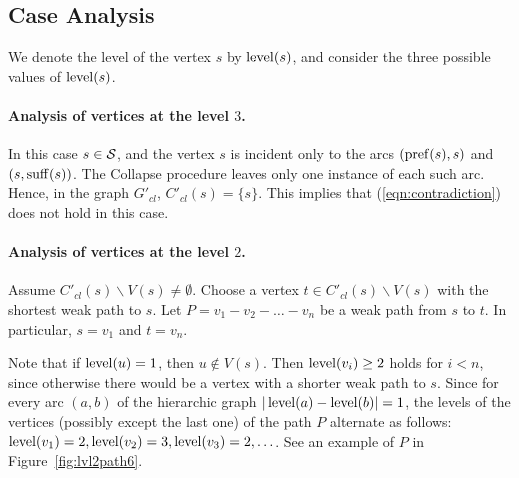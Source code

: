 \subsection{Case Analysis}
\label{sec:proof2}
We denote the level of the vertex $ s $ by $ \operatorname{level} (s) $, and consider the three possible values of $\operatorname{level}(s)$.


\paragraph{Analysis of vertices at the level \texorpdfstring{$3$}{3}.}

In this case $ s \in {\cal S} $, and the vertex $ s $ is incident only to the arcs $ (\operatorname{pref} (s), s)$ and $(s, \operatorname{suff} (s)) $. The Collapse procedure leaves only one instance of each such arc. Hence, in the graph $ G'_{cl} $, $ C'_{cl} (s) = \{s \} $. This implies that (\ref{eqn:contradiction}) does not hold in this case.

\paragraph{Analysis of vertices at the level \texorpdfstring{$2$}{2}.}

Assume $ C'_{cl} (s) \backslash V (s) \ne\emptyset$. Choose a vertex $ t\in C'_{cl} (s) \backslash V (s)$ with the shortest weak path to $s$. Let $P = v_1 - v_2 - \ldots - v_n $ be a weak path from $s$ to $t$. In particular, $s=v_1$ and $t=v_n$.

Note that if $ \operatorname{level} (u) = 1 $, then $ u \notin V (s) $. Then $ \operatorname{level} (v_i) \ge 2 $ holds for $ i<n $, since otherwise there would be a vertex with a shorter weak path to $s$. Since for every arc $(a,b)$ of the hierarchic graph $ | \operatorname{level} (a) - \operatorname{level} (b) | = 1 $,  the levels of the vertices (possibly except the last one) of the path $P$ alternate as follows: $ \operatorname{level} (v_1) = 2, \operatorname{level} (v_2) = 3, \operatorname{level} (v_3) = 2,\ldots$. See an example of $P$ in Figure~\ref{fig:lvl2path6}.

